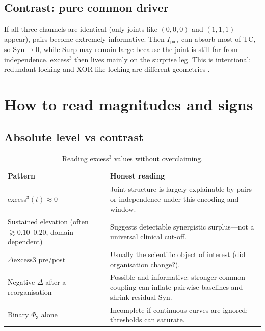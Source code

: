 \documentclass[11pt,a4paper]{article}
\begin{document}
\subsection{Contrast: pure common driver}

If all three channels are identical (only joints like $(0,0,0)$ and
$(1,1,1)$ appear), pairs become extremely informative. Then
$I_{\mathrm{pair}}$ can absorb most of TC, so $\mathrm{Syn}\to 0$, while
$\mathrm{Surp}$ may remain large because the joint is still far from
independence. excess$^3$ then lives mainly on the surprise leg. This is
intentional: redundant locking and XOR-like locking are different geometries
\citep{Padilla2026excess3}.

\section{How to read magnitudes and signs}
\label{sec:read}

\subsection{Absolute level vs contrast}

\begin{table}[H]
\centering
\caption{Reading excess$^3$ values without overclaiming.}
\label{tab:reading}
\small
\begin{tabularx}{\textwidth}{@{}>{\raggedright\arraybackslash}p{3.4cm} X@{}}
\toprule
\textbf{Pattern} & \textbf{Honest reading} \\
\midrule
excess$^3(t)\approx 0$
  & Joint structure is largely explainable by pairs or independence under
    this encoding and window. \\
Sustained elevation
  (often $\gtrsim 0.10$--$0.20$, domain-dependent)
  & Suggests detectable synergistic surplus---not a universal clinical
    cut-off. \\
$\Delta\mathrm{excess3}$ pre/post
  & Usually the scientific object of interest (did organisation change?). \\
Negative $\Delta$ after a reorganisation
  & Possible and informative: stronger common coupling can inflate pairwise
    baselines and shrink residual Syn. \\
Binary $\Phi_3$ alone
  & Incomplete if continuous curves are ignored; thresholds can saturate. \\
\bottomrule
\end{tabularx}
\end{table}
\end{document}
